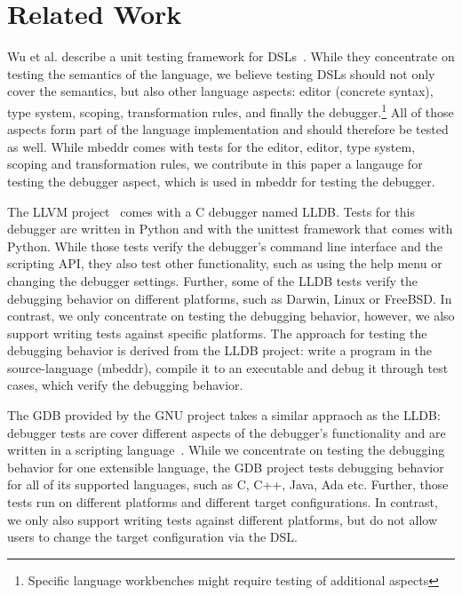 \newpage
\section{Related Work}

Wu et al. describe a unit testing framework for
\acp{DSL}~\cite{DBLP:conf/dsl/WuGM09}. 
While they concentrate on testing the semantics of the language, we believe testing
\acp{DSL} should not only cover the semantics, but also other language
aspects: editor (concrete syntax), type system, scoping, transformation rules,
and finally the debugger.\footnote{Specific language workbenches might require
testing of additional aspects} All of those aspects
form part of the language implementation and should therefore be tested as well.
While mbeddr comes with tests for the editor, editor, type system, scoping and
transformation rules, we contribute in this paper a langauge for testing the
debugger aspect, which is used in mbeddr for testing the debugger.

The \ac{LLVM} project~\cite{LLDB} comes with a C debugger named \ac{LLDB}.
Tests for this debugger are written in Python and with the 
unittest framework that comes with Python.
While those tests verify the debugger's command
line interface and the scripting API, they also test other functionality, such
as using the help menu or changing the debugger settings.
Further, some of the \ac{LLDB} tests  
verify the debugging behavior on different platforms, such as Darwin, Linux or
FreeBSD. In contrast, we only concentrate on testing the debugging behavior,
however, we also support writing tests against specific platforms. 
The approach for testing the debugging behavior is derived from the \ac{LLDB}
project:
write a program in the source-language (mbeddr), compile it to an executable and
debug it through test cases, which verify the debugging behavior.

The \ac{GDB} provided by the GNU project takes a similar
appraoch as the \ac{LLDB}: debugger tests are cover different aspects of the
debugger's functionality and are written in a scripting language~\cite{gdb}.
While we concentrate on testing the debugging behavior for one extensible
language, the \ac{GDB} project tests debugging behavior for all of its supported
languages, such as C, C++, Java, Ada etc. Further, those tests run on different
platforms and different target configurations. In contrast, we only also support
writing tests against different platforms, but do not allow users to change the
target configuration via the \ac{DSL}.
